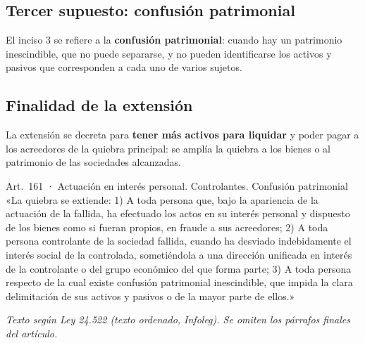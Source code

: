 \documentclass[12pt,oneside]{book}
\begin{document}
\subsection{Tercer supuesto: confusión patrimonial}

El inciso 3 se refiere a la \textbf{confusión patrimonial}: cuando hay un patrimonio inescindible, que no puede separarse, y no pueden identificarse los activos y pasivos que corresponden a cada uno de varios sujetos.

\subsection{Finalidad de la extensión}

La extensión se decreta para \textbf{tener más activos para liquidar} y poder pagar a los acreedores de la quiebra principal: se amplía la quiebra a los bienes o al patrimonio de las sociedades alcanzadas.

\begin{norma}{Art.~161 · Actuación en interés personal. Controlantes. Confusión patrimonial}
«La quiebra se extiende: 1) A toda persona que, bajo la apariencia de la actuación de la fallida, ha efectuado los actos en su interés personal y dispuesto de los bienes como si fueran propios, en fraude a sus acreedores; 2) A toda persona controlante de la sociedad fallida, cuando ha desviado indebidamente el interés social de la controlada, sometiéndola a una dirección unificada en interés de la controlante o del grupo económico del que forma parte; 3) A toda persona respecto de la cual existe confusión patrimonial inescindible, que impida la clara delimitación de sus activos y pasivos o de la mayor parte de ellos.»

\par\smallskip\textit{Texto según Ley 24.522 (texto ordenado, Infoleg). Se omiten los párrafos finales del artículo.}
\end{norma}
\end{document}
